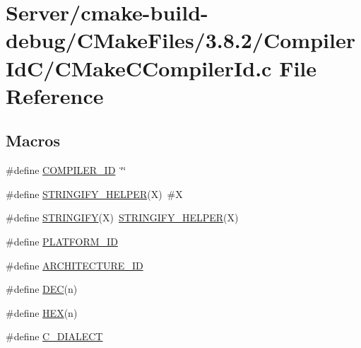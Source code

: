 \hypertarget{Server_2cmake-build-debug_2CMakeFiles_23_88_82_2CompilerIdC_2CMakeCCompilerId_8c}{}\section{Server/cmake-\/build-\/debug/\+C\+Make\+Files/3.8.2/\+Compiler\+Id\+C/\+C\+Make\+C\+Compiler\+Id.c File Reference}
\label{Server_2cmake-build-debug_2CMakeFiles_23_88_82_2CompilerIdC_2CMakeCCompilerId_8c}
\subsection*{Macros}
\begin{DoxyCompactItemize}
\item 
\#define \mbox{\hyperlink{Server_2cmake-build-debug_2CMakeFiles_23_88_82_2CompilerIdC_2CMakeCCompilerId_8c_a81dee0709ded976b2e0319239f72d174}{C\+O\+M\+P\+I\+L\+E\+R\+\_\+\+ID}}~\char`\"{}\char`\"{}
\item 
\#define \mbox{\hyperlink{Server_2cmake-build-debug_2CMakeFiles_23_88_82_2CompilerIdC_2CMakeCCompilerId_8c_a2ae9b72bb13abaabfcf2ee0ba7d3fa1d}{S\+T\+R\+I\+N\+G\+I\+F\+Y\+\_\+\+H\+E\+L\+P\+ER}}(X)~\#X
\item 
\#define \mbox{\hyperlink{Server_2cmake-build-debug_2CMakeFiles_23_88_82_2CompilerIdC_2CMakeCCompilerId_8c_a43e1cad902b6477bec893cb6430bd6c8}{S\+T\+R\+I\+N\+G\+I\+FY}}(X)~\mbox{\hyperlink{Server_2cmake-build-debug_2CMakeFiles_23_88_82_2CompilerIdCXX_2CMakeCXXCompilerId_8cpp_a2ae9b72bb13abaabfcf2ee0ba7d3fa1d}{S\+T\+R\+I\+N\+G\+I\+F\+Y\+\_\+\+H\+E\+L\+P\+ER}}(X)
\item 
\#define \mbox{\hyperlink{Server_2cmake-build-debug_2CMakeFiles_23_88_82_2CompilerIdC_2CMakeCCompilerId_8c_adbc5372f40838899018fadbc89bd588b}{P\+L\+A\+T\+F\+O\+R\+M\+\_\+\+ID}}
\item 
\#define \mbox{\hyperlink{Server_2cmake-build-debug_2CMakeFiles_23_88_82_2CompilerIdC_2CMakeCCompilerId_8c_aba35d0d200deaeb06aee95ca297acb28}{A\+R\+C\+H\+I\+T\+E\+C\+T\+U\+R\+E\+\_\+\+ID}}
\item 
\#define \mbox{\hyperlink{Server_2cmake-build-debug_2CMakeFiles_23_88_82_2CompilerIdC_2CMakeCCompilerId_8c_ad1280362da42492bbc11aa78cbf776ad}{D\+EC}}(n)
\item 
\#define \mbox{\hyperlink{Server_2cmake-build-debug_2CMakeFiles_23_88_82_2CompilerIdC_2CMakeCCompilerId_8c_a46d5d95daa1bef867bd0179594310ed5}{H\+EX}}(n)
\item 
\#define \mbox{\hyperlink{Server_2cmake-build-debug_2CMakeFiles_23_88_82_2CompilerIdC_2CMakeCCompilerId_8c_a07f8e5783674099cd7f5110e22a78cdb}{C\+\_\+\+D\+I\+A\+L\+E\+CT}}
\end{DoxyCompactItemize}
